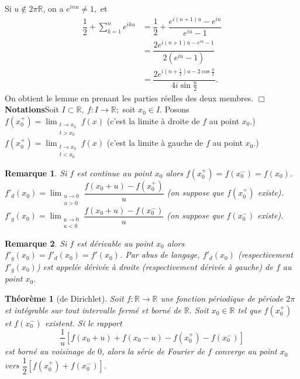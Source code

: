 \documentclass[11pt, a4paper]{book}
\newtheorem{teo}{Th\'eor\`eme}[section]
\newtheorem{rem}{Remarque}[section]
\newenvironment{pr}{\noindent {\bf Preuve} \noindent} {\hfill $\Box$\vskip 5mm}
\begin{document}
\begin{pr}\quad
Si $u\notin 2\pi\mathbb{R}$, on a $e^{inu}\neq1,$ et 
\begin{align*}
\dfrac{1}{2}+\sum_{k=1}^ne^{iku}&=\dfrac{1}{2}+\dfrac{e^{i(n+1)u}-e^{iu}}{e^{iu}-1}\\&=\dfrac{2e^{i(n+1)u-e^{iu}-1}}{2(e^{iu}-1)}\\&=\dfrac{2e^{i(n+\frac{1}{2})u-2\cos \frac{u}{2}}}{4i\sin\frac{u}{2}}.
\end{align*}
On obtient le lemme en prenant les parties r\'eelles des deux membres.
\end{pr}
\textbf{Notations}\quad Soit $I\subset\mathbb{R},~f:I\rightarrow\mathbb{R};$ soit $x_0\in I$. Posons \\
${\displaystyle f(x_0^+)=\lim_{\substack{t\rightarrow x_0\\t>x_0}}f(x)}$ (c'est la limite \`a droite de $f$ au point $x_0.$)\\
${\displaystyle f(x_0^+)=\lim_{\substack{t\rightarrow x_0\\t<x_0}}f(x)}$ (c'est la limite \`a gauche de $f$ au point $x_0.$)
\begin{rem} Si $f$ est continue au point $x_0$ alors $f(x_0^+)=f(x_0^-)=f(x_0)$.\\
${\displaystyle f'_d(x_0)=\lim_{\substack{u\to0\\u>0}}\dfrac{f(x_0+u)-f(x_0^+)}{u}}$ (on suppose que $f(x_0^+)$ existe).\\
${\displaystyle f'_g(x_0)=\lim_{\substack{u\to0\\u<0}}\dfrac{f(x_0+u)-f(x_0^-)}{u}}$ (on suppose que $f(x_0^-)$ existe).
\end{rem}
\begin{rem} Si $f$ est d\'erivable au point $x_0$ alors $f'_g(x_0)=f'_d(x_0)=f'(x_0)$. Par abus de langage, $f'_d(x_0)$ (respectivement $f'_g(x_0)$) est appel\'ee d\'eriv\'ee \`a droite (respectivement d\'eriv\'ee \`a gauche) de $f$ au point $x_0.$
\end{rem}
\begin{teo}[de Dirichlet]\label{teo7.2.1} Soit $f:\mathbb{R}\to\mathbb{R}$ une fonction p\'eriodique de p\'eriode $2\pi$ et int\'egrable sur tout intervalle ferm\'e et born\'e de $\mathbb{R}.$ Soit $x_0\in \mathbb{R}$ tel que $f(x_0^+)$ et $f(x_0^-)$ existent. Si le rapport $$\dfrac{1}{u}\left[f(x_0+u)+f(x_0-u)-f(x_0^+)-f(x_0^-)\right]$$ est born\'e au voisinage de $0$, alors la s\'erie de Fourier de $f$ converge au point $x_0$ vers $\dfrac{1}{2}\left[f(x_0^+)+f(x_0^-)\right]$.
\end{teo}
\end{document}
